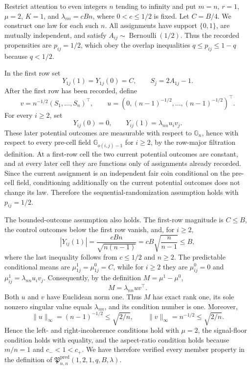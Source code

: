 Restrict attention to even integers \(n\) tending to infinity and put \(m=n\), \(r=1\), \(\mu=2\), \(K=1\), and \(\lambda_{nn}=cBn\), where \(0<c\le 1/2\) is fixed.  Let \(C=B/4\).  We construct one law for each such \(n\).  All assignments have support \(\{0,1\}\), are mutually independent, and satisfy \(A_{ij}\sim\operatorname{Bernoulli}(1/2)\).  Thus the recorded propensities are \(p_{ij}=1/2\), which obey the overlap inequalities \(q\le p_{ij}\le1-q\) because \(q<1/2\).

In the first row set
\[
Y_{1j}(1)=Y_{1j}(0)=C,
\qquad
S_j=2A_{1j}-1.
\]
After the first row has been recorded, define
\[
v=n^{-1/2}(S_1,\ldots,S_n)^\top,
\qquad
u=(0,(n-1)^{-1/2},\ldots,(n-1)^{-1/2})^\top.
\]
For every \(i\ge2\), set
\[
Y_{ij}(0)=0,
\qquad
Y_{ij}(1)=\lambda_{nn}u_iv_j.
\]
These later potential outcomes are measurable with respect to \(\mathbb G_n\), hence with respect to every pre-cell field \(\mathbb G_{o(i,j)-1}\) for \(i\ge2\), by the row-major filtration definition.  At a first-row cell the two current potential outcomes are constant, and at every later cell they are functions only of assignments already recorded.  Since the current assignment is an independent fair coin conditional on the pre-cell field, conditioning additionally on the current potential outcomes does not change its law.  Therefore the sequential-randomization assumption holds with \(p_{ij}=1/2\).

The bounded-outcome assumption also holds.  The first-row magnitude is \(C\le B\), the control outcomes below the first row vanish, and, for \(i\ge2\),
\[
|Y_{ij}(1)|
=\frac{cBn}{\sqrt{n(n-1)}}
=cB\sqrt{\frac n{n-1}}
\le B,
\]
where the last inequality follows from \(c\le1/2\) and \(n\ge2\).  The predictable conditional means are \(\mu^1_{1j}=\mu^0_{1j}=C\), while for \(i\ge2\) they are \(\mu^0_{ij}=0\) and \(\mu^1_{ij}=\lambda_{nn}u_iv_j\).  Consequently, by the definition \(M=\mu^1-\mu^0\),
\[
M=\lambda_{nn}uv^\top.
\]
Both \(u\) and \(v\) have Euclidean norm one.  Thus \(M\) has exact rank one, its sole nonzero singular value equals \(\lambda_{nn}\), and its condition number is one.  Moreover,
\[
\lVert u\rVert_\infty=(n-1)^{-1/2}\le\sqrt{2/n},
\qquad
\lVert v\rVert_\infty=n^{-1/2}\le\sqrt{2/n}.
\]
Hence the left- and right-incoherence conditions hold with \(\mu=2\), the signal-floor condition holds with equality, and the aspect-ratio condition holds because \(m/n=1\) and \(c_-<1<c_+\).  We have therefore verified every member property in the definition of \(\mathfrak P^{\mathrm{pred}}_{n,n}(1,2,1,q,B,\lambda)\).

